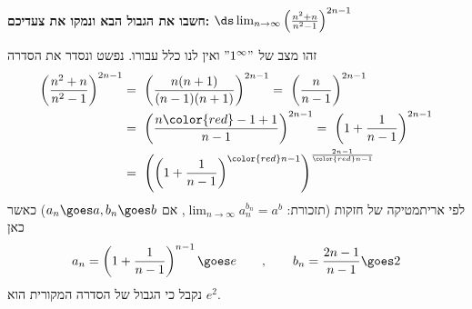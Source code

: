 \textbf{חשבו את הגבול הבא ונמקו את צעדיכם:}
$\ds\lim_{n \to \infty} \left( \frac{n^2 + n}{n^2 - 1} \right)^{2n - 1}$
\begin{solbox}
    זהו מצב של
    $"1^{\infty}"$
    ואין לנו כלל עבורו.
נפשט ונסדר את הסדרה
\begin{align*}
    \left( \frac{n^2 + n}{n^2 - 1} \right)^{2n - 1}
    &=\ \left( \frac{n(n + 1)}{(n - 1)(n+1)} \right)^{2n - 1}
    =\ \left( \frac{n}{n - 1} \right)^{2n - 1}\\
    &=\ \left( \frac{n{\color{red}-1+1}}{n - 1} \right)^{2n - 1}=\ \left( 1+\frac{1}{n - 1} \right)^{2n - 1}\\
    &=\ \left(\left( 1+\frac{1}{n - 1} \right)^{{\color{red}n - 1}}\right)^{\frac{2n-1}{\color{red}n-1}}
\end{align*}
לפי אריתמטיקה של חזקות (תזכורת:
$\displaystyle\lim_{n\to\infty}a_n^{b_n}=a^b$,
אם
$a_n\goes a,b_n\goes b$)
כאשר
כאן
$$a_n=\left(1+\frac{1}{n-1}\right)^{n-1}\goes e\qquad,\qquad
b_n=\frac{2n-1}{n-1}\goes 2$$
נקבל כי הגבול של הסדרה המקורית הוא
$e^2$.
\end{solbox}

